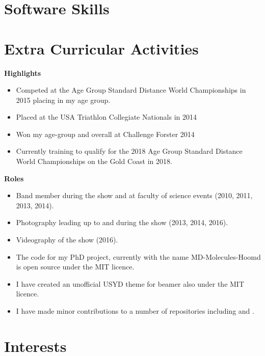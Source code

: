 \pagebreak
\section{Software Skills}


\section{Extra Curricular Activities}

{%
\textbf{Highlights}
\begin{itemize}
  \item Competed at the Age Group Standard Distance World Championships in 2015 placing  in my age group.
  \item Placed  at the USA Triathlon Collegiate Nationals in 2014
  \item Won my age-group and  overall at Challenge Forster 2014
  \item Currently training to qualify for the 2018 Age Group Standard Distance World Championships on the Gold Coast in 2018.
\end{itemize}
}

{%
\textbf{Roles}
\begin{itemize}
  \item Band member during the show and at faculty of science events (2010, 2011, 2013, 2014).
  \item Photography leading up to and during the show (2013, 2014, 2016).
  \item Videography of the show (2016).
\end{itemize}
}

{%
\begin{itemize}
  \item The code for my PhD project, currently with the name MD-Molecules-Hoomd is open source under the MIT licence.
  \item I have created an unofficial USYD theme for beamer also under the MIT licence.
  \item I have made minor contributions to a number of repositories including  and .
\end{itemize}
}

\section{Interests}

\vspace{2em}


